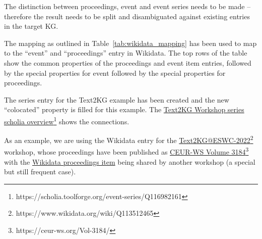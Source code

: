 \documentclass[]{ceurart}
\newcommand{\tquote}[1]{``#1''}
\newcommand{\footnotelink}[2]{\href{#1}{#2}\footnote{#1}}
\begin{document}
The distinction between proceedings, event and event series needs to be made -- therefore the result needs to be split and disambiguated against existing entries in the target KG.

The mapping as outlined in Table~\ref{tab:wikidata_mapping} has been used to map to the \tquote{event} and \tquote{proceedings} entry in Wikidata.  The top rows of the table show the common properties of the proceedings and event item entries, followed by the special properties for event followed by the special properties for proceedings.

The series entry for the Text2KG example has been created and the new \tquote{colocated} property is  filled for this example. The \footnotelink{https://scholia.toolforge.org/event-series/Q116982161}{Text2KG Workshop series scholia overview} shows the connections.

As an example, we are using the Wikidata entry for the \footnotelink{https://www.wikidata.org/wiki/Q113512465}{Text2KG@ESWC-2022} workshop, whose proceedings have been published as \footnotelink{https://ceur-ws.org/Vol-3184/}{CEUR-WS Volume 3184} with the \href{https://www.wikidata.org/wiki/Q113512180}{Wikidata proceedings item} being shared by another workshop (a special but still frequent case).
\end{document}
